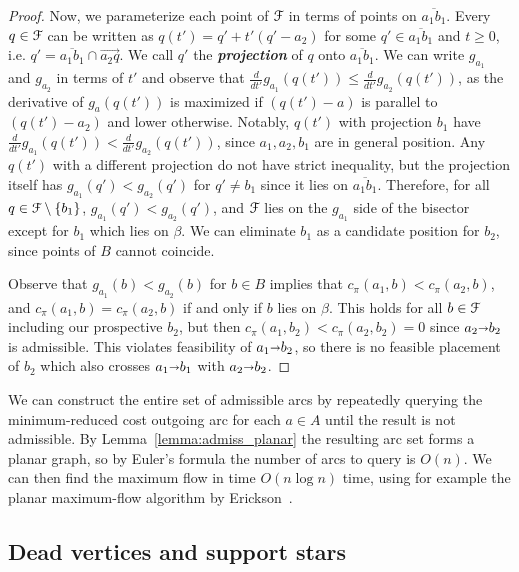 \documentclass[a4paper,UKenglish]{socg-lipics-v2018}
\def\arcto{\mathord\shortrightarrow}
\def\arc#1#2{#1\arcto#2}
\theoremstyle{plain}
\numberwithin{figure}{section}
\def\EMPH#1{\textbf{\emph{\boldmath #1}}}
\begin{document}
\begin{proof}
Now, we parameterize each point of $\EuScript{F}$ in terms of points on
$\overline{a_1 b_1}$.
Every $q \in \EuScript{F}$ can be written as $q(t') = q' + t'(q' - a_2)$ for
some $q' \in \overline{a_1 b_1}$ and $t \geq 0$, i.e.
$q' = \overline{a_1 b_1} \cap \overrightarrow{a_2 q}$.
We call $q'$ the \EMPH{projection} of $q$ onto $\overline{a_1 b_1}$.
We can write $g_{a_1}$ and $g_{a_2}$ in terms of $t'$ and observe that
$\frac{d}{dt'}g_{a_1}(q(t')) \leq \frac{d}{dt'}g_{a_2}(q(t'))$, as the
derivative of $g_a(q(t'))$ is maximized if $(q(t') - a)$ is parallel to
$(q(t') - a_2)$ and lower otherwise.
Notably, $q(t')$ with projection $b_1$ have
$\frac{d}{dt'}g_{a_1}(q(t')) < \frac{d}{dt'}g_{a_2}(q(t'))$, since
$a_1, a_2, b_1$ are in general position.
Any $q(t')$ with a different projection do not have strict inequality, but
the projection itself has $g_{a_1}(q') < g_{a_2}(q')$ for $q' \neq b_1$ since
it lies on $\overline{a_1 b_1}$.
Therefore, for all $q \in \EuScript{F} \setminus\{b_1\}$,
$g_{a_1}(q') < g_{a_2}(q')$, and $\EuScript{F}$ lies on the $g_{a_1}$ side of
the bisector except for $b_1$ which lies on $\beta$.
We can eliminate $b_1$ as a candidate position for $b_2$, since points of $B$
cannot coincide.

Observe that $g_{a_1}(b) < g_{a_2}(b)$ for $b \in B$ implies that
$c_\pi(a_1, b) < c_\pi(a_2, b)$, and $c_\pi(a_1, b) = c_\pi(a_2, b)$ if and
only if $b$ lies on $\beta$.
This holds for all $b \in \EuScript{F}$ including our prospective $b_2$,
but then $c_\pi(a_1, b_2) < c_\pi(a_2, b_2) = 0$ since $\arc{a_2}{b_2}$ is
admissible.
This violates feasibility of $\arc{a_1}{b_2}$, so there is no feasible
placement of $b_2$ which also crosses $\arc{a_1}{b_1}$ with $\arc{a_2}{b_2}$.
\end{proof}

We can construct the entire set of admissible arcs by repeatedly querying
the minimum-reduced cost outgoing arc for each $a \in A$ until the result is
not admissible.
By Lemma~\ref{lemma:admiss_planar} the resulting arc set forms a planar graph,
so by Euler's formula the number of arcs to query is $O(n)$.
We can then find the maximum flow in time $O(n\log n)$ time, using for example the
planar maximum-flow algorithm by Erickson~\cite{E10}. \cite{Other citations like Klein}

\subsection{Dead vertices and support stars}
\end{document}

